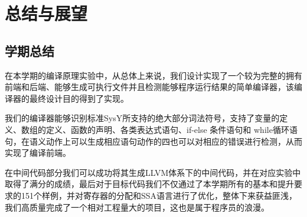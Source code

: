 \documentclass[UTF8,a4paper,10pt]{ctexart}
\newcommand{\xiaosi}{\fontsize{12pt}{18pt}\selectfont}            %
\begin{document}

    






\newpage
\section{总结与展望}
\subsection{学期总结}
在本学期的编译原理实验中，从总体上来说，我们设计实现了一个较为完整的拥有前端和后端、能够生成可执行文件并且检测能够程序运行结果的简单编译器，该编译器的最终设计目的得到了实现。


我们的编译器能够识别标准SysY所支持的绝大部分词法符号，支持了变量的定义、数组的定义、函数的声明、各类表达式语句、if-else 条件语句和 while循环语句，在语义动作上可以生成相应语句动作的四也可以对相应的错误进行检测，从而实现了编译前端。

在中间代码部分我们可以成功将其生成LLVM体系下的中间代码，并在对应实验中取得了满分的成绩，最后对于目标代码我们不仅通过了本学期所有的基本和提升要求的151个样例，并对寄存器的分配和SSA语言进行了优化，整体下来获益匪浅，我们高质量完成了一个相对工程量大的项目，这也是属于程序员的浪漫。
\end{document}
